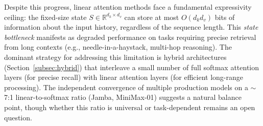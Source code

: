 Despite this progress, linear attention methods face a fundamental expressivity ceiling: the fixed-size state $S \in \mathbb{R}^{d_k \times d_v}$ can store at most $O(d_k d_v)$ bits of information about the input history, regardless of the sequence length. This \emph{state bottleneck} manifests as degraded performance on tasks requiring precise retrieval from long contexts (e.g., needle-in-a-haystack, multi-hop reasoning). The dominant strategy for addressing this limitation is hybrid architectures (Section~\ref{subsec:hybrid}) that interleave a small number of full softmax attention layers (for precise recall) with linear attention layers (for efficient long-range processing). The independent convergence of multiple production models on a ${\sim}$7:1 linear-to-softmax ratio (Jamba, MiniMax-01) suggests a natural balance point, though whether this ratio is universal or task-dependent remains an open question.
